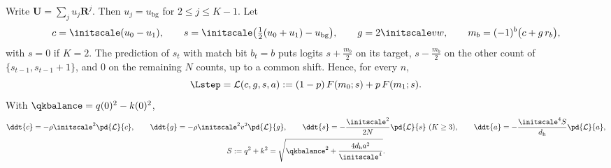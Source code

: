 \begin{lemma}
\label{lem:J-reduce}
Write $\mathbf U=\sum_ju_j\mathbf R^j$. Then $u_j=u_{\mathrm{bg}}$ for $2\le j\le K-1$. Let
\[
 c=\initscale(u_0-u_1),\qquad s=\initscale\bigl(\tfrac{1}{2}(u_0+u_1)-u_{\mathrm{bg}}\bigr),\qquad g=2\initscale vw,\qquad m_b=(-1)^b\bigl(c+g\,r_b\bigr),
\]
with $s=0$ if $K=2$. The prediction of $s_t$ with match bit $b_t=b$ puts logits $s+\frac{m_b}{2}$ on its target, $s-\frac{m_b}{2}$ on the other count of
$\{s_{t-1},s_{t-1}+1\}$, and $0$ on the remaining $N$ counts, up to a common shift. Hence, for every $n$,
\[
 \Lstep=\mathcal L(c,g,s,a):=(1-p)\,F(m_0;s)+p\,F(m_1;s).
\]
With $\qkbalance=q(0)^2-k(0)^2$,
\begin{equation}
 \begin{gathered}
 \ddt{c}=-\rho\initscale^2\pd{\mathcal L}{c},\qquad \ddt{g}=-\rho\initscale^2v^2\pd{\mathcal L}{g},\qquad \ddt{s}=-\frac{\initscale^2}{2N}\pd{\mathcal L}{s}\ (K\ge3),\qquad \ddt{a}=-\frac{\initscale^4S}{d_{\mathrm h}}\pd{\mathcal L}{a},\\
 S:=q^2+k^2=\sqrt{\qkbalance^2+\frac{4d_{\mathrm h}a^2}{\initscale^4}}.
 \end{gathered}
 \label{eq:J-flow}
\end{equation}
\end{lemma}

